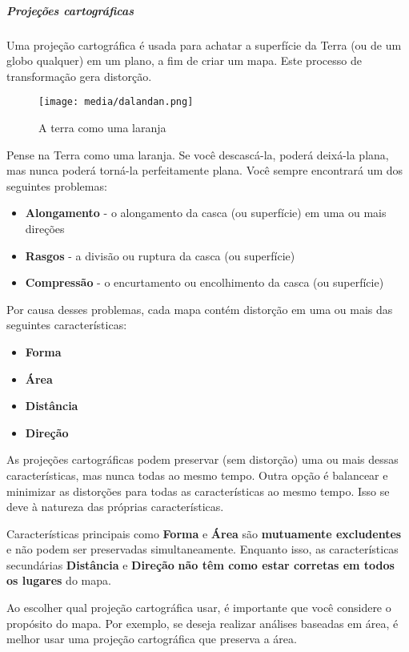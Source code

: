 \documentclass[
]{book}
\providecommand{\tightlist}{%
  \setlength{\itemsep}{0pt}\setlength{\parskip}{0pt}}
\theoremstyle{definition}
\theoremstyle{definition}
\theoremstyle{definition}
\theoremstyle{definition}
\theoremstyle{remark}
\begin{document}
\hypertarget{projeuxe7uxf5es-cartogruxe1ficas}{%
\subparagraph{Projeções cartográficas}\label{projeuxe7uxf5es-cartogruxe1ficas}}

Uma projeção cartográfica é usada para achatar a superfície da Terra (ou de um globo qualquer) em um plano, a fim de criar um mapa. Este processo de transformação gera distorção.

\begin{figure}
\centering
\texttt{[image: media/dalandan.png]}
\caption{A terra como uma laranja}
\end{figure}

Pense na Terra como uma laranja. Se você descascá-la, poderá deixá-la plana, mas nunca poderá torná-la perfeitamente plana. Você sempre encontrará um dos seguintes problemas:

\begin{itemize}
\tightlist
\item
  \textbf{Alongamento} - o alongamento da casca (ou superfície) em uma ou mais direções
\item
  \textbf{Rasgos} - a divisão ou ruptura da casca (ou superfície)
\item
  \textbf{Compressão} - o encurtamento ou encolhimento da casca (ou superfície)
\end{itemize}

Por causa desses problemas, cada mapa contém distorção em uma ou mais das seguintes características:

\begin{itemize}
\tightlist
\item
  \textbf{Forma}
\item
  \textbf{Área}
\item
  \textbf{Distância}
\item
  \textbf{Direção}
\end{itemize}

As projeções cartográficas podem preservar (sem distorção) uma ou mais dessas características, mas nunca todas ao mesmo tempo. Outra opção é balancear e minimizar as distorções para todas as características ao mesmo tempo. Isso se deve à natureza das próprias características.

Características principais como \textbf{Forma} e \textbf{Área} são \textbf{mutuamente excludentes} e não podem ser preservadas simultaneamente. Enquanto isso, as características secundárias \textbf{Distância} e \textbf{Direção} \textbf{não têm como estar corretas em todos os lugares} do mapa.

Ao escolher qual projeção cartográfica usar, é importante que você considere o propósito do mapa. Por exemplo, se deseja realizar análises baseadas em área, é melhor usar uma projeção cartográfica que preserva a área.
\end{document}
